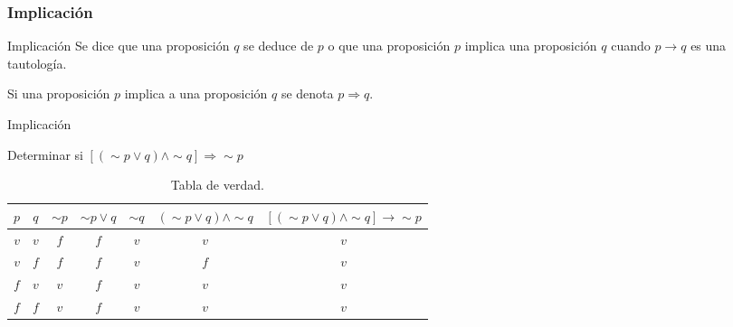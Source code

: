 \subsubsection{Implicación}

\begin{definicionn}{Implicación} Se dice que una proposición $q$
se deduce de $p$ o que una proposición $p$ implica una proposición
$q$ cuando $p\rightarrow q$ es una tautología.\end{definicionn}

\notacion  Si una proposición $p$ implica a una proposición $q$
se denota $p\Rightarrow q.$

\begin{ejem}{Implicación}

Determinar si $\left[\left(\sim p\vee q\right)\wedge\sim q\right]\Rightarrow\sim p$
\end{ejem}

\solucion 
\begin{table}[H]
\centering

\caption{Tabla de verdad.}


\begin{tabular}{c|c|c|c|c|c|c}
\arrayrulecolor{ptctitle}\cellcolor{ptctitle!50}$p$ & \cellcolor{ptctitle!50}$q$ & \cellcolor{ptctitle!50}$\sim p$ & \cellcolor{ptctitle!50}$\sim p\vee q$ & \cellcolor{ptctitle!50}$\sim q$ & \cellcolor{ptctitle!50}\foreignlanguage{english}{$\left(\sim p\vee q\right)\wedge\sim q$} & \cellcolor{ptctitle!50}$\left[\left(\sim p\vee q\right)\wedge\sim q\right]\rightarrow\sim p$ \tabularnewline
\hline 
\cellcolor{ptcbackground} $v$ & \cellcolor{ptcbackground}$v$ & \cellcolor{ptcbackground}$f$ & \cellcolor{ptcbackground}$f$ & \cellcolor{ptcbackground}$v$ & \cellcolor{ptcbackground}$v$ & \cellcolor{ptcbackground}$v$\tabularnewline
\hline 
\cellcolor{gray!50}$v$ & \cellcolor{gray!50} $f$ & \cellcolor{gray!50}$f$ & \cellcolor{gray!50}$f$ & \cellcolor{gray!50}$v$ & \cellcolor{gray!50}$f$ & \cellcolor{gray!50}$v$\tabularnewline
\hline 
\cellcolor{ptcbackground}$f$ & \cellcolor{ptcbackground} $v$ & \cellcolor{ptcbackground} $v$ & \cellcolor{ptcbackground}$f$ & \cellcolor{ptcbackground}$v$ & \cellcolor{ptcbackground}$v$ & \cellcolor{ptcbackground}$v$\tabularnewline
\hline 
\cellcolor{gray!50} $f$ & \cellcolor{gray!50} $f$ & \cellcolor{gray!50} $v$ & \cellcolor{gray!50}$f$ & \cellcolor{gray!50}$v$ & \cellcolor{gray!50}$v$ & \cellcolor{gray!50}$v$\tabularnewline
\hline 
\end{tabular}
\end{table}


